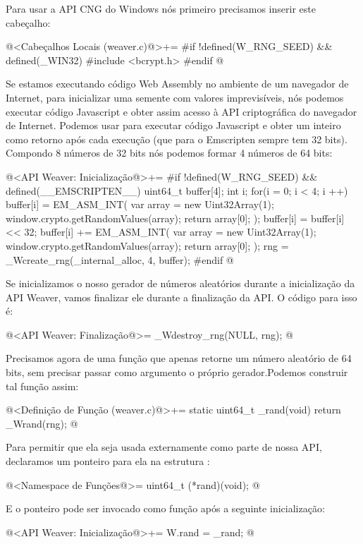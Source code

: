 Para usar a API CNG do Windows nós primeiro precisamos inserir este
cabeçalho:

\iniciocodigo
@<Cabeçalhos Locais (weaver.c)@>+=
#if !defined(W_RNG_SEED) && defined(_WIN32)
#include <bcrypt.h>
#endif
@
\fimcodigo

Se estamos executando código Web Assembly no ambiente de um navegador
de Internet, para inicializar uma semente com valores imprevisíveis,
nós podemos executar código Javascript e obter assim acesso à API
criptográfica do navegador de Internet. Podemos
usar  para executar código Javascript e obter
um inteiro como retorno após cada execução (que para o Emscripten
sempre tem 32 bits). Compondo 8 números de 32 bits nós podemos formar
4 números de 64 bits:

\iniciocodigo
@<API Weaver: Inicialização@>+=
#if !defined(W_RNG_SEED) && defined(__EMSCRIPTEN__)
{
  uint64_t buffer[4];
  int i;
  for(i = 0; i < 4; i ++){
    buffer[i] = EM_ASM_INT({
      var array = new Uint32Array(1);
      window.crypto.getRandomValues(array);
      return array[0];
    });
    buffer[i] = buffer[i] << 32;
    buffer[i] += EM_ASM_INT({
      var array = new Uint32Array(1);
      window.crypto.getRandomValues(array);
      return array[0];
    });
  }
  rng = _Wcreate_rng(_internal_alloc, 4, buffer);
}
#endif
@
\fimcodigo

Se inicializamos o nosso gerador de números aleatórios durante a
inicialização da API Weaver, vamos finalizar ele durante a finalização
da API. O código para isso é:

\iniciocodigo
@<API Weaver: Finalização@>=
_Wdestroy_rng(NULL, rng);
@
\fimcodigo

Precisamos agora de uma função que apenas retorne um número aleatório
de 64 bits, sem precisar passar como argumento o próprio
gerador.Podemos construir tal função assim:

\iniciocodigo
@<Definição de Função (weaver.c)@>+=
static uint64_t _rand(void){
  return _Wrand(rng);
}
@
\fimcodigo

Para permitir que ela seja usada externamente como parte de nossa API,
declaramos um ponteiro para ela na estrutura :

\iniciocodigo
@<Namespace de Funções@>=
uint64_t (*rand)(void);
@
\fimcodigo

E o ponteiro pode ser invocado como função após a seguinte
inicialização:

\iniciocodigo
@<API Weaver: Inicialização@>+=
W.rand = _rand;
@
\fimcodigo

